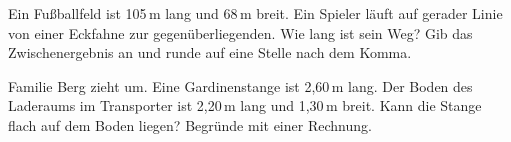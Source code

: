\documentclass[11pt]{article}
\newcommand{\aufg}[3]{\par\noindent\makebox[0pt][r]{#3}\begin{minipage}[t]{\linewidth}#1\end{minipage}\par}
\newcommand{\nr}[1]{\makebox[7mm][l]{\textbf{#1}}}
\begin{document}
\medskip
\aufg{\nr{3.}Ein Fußballfeld ist 105\,m lang und 68\,m breit. Ein Spieler läuft auf gerader Linie von einer Eckfahne zur gegenüberliegenden. Wie lang ist sein Weg? Gib das Zwischenergebnis an und runde auf eine Stelle nach dem Komma.}{}{}
\medskip
\aufg{\nr{4.}Familie Berg zieht um. Eine Gardinenstange ist 2,60\,m lang. Der Boden des Laderaums im Transporter ist 2,20\,m lang und 1,30\,m breit. Kann die Stange flach auf dem Boden liegen? Begründe mit einer Rechnung.}{}{{\scriptsize\color{mbgrau}Ziel\hspace{2mm}}}
\medskip
\par\vspace{3mm}\setlength{\kr}{\dimexpr\pagegoal-\pagetotal-10mm\relax}%
\ifdim\kr>12mm\noindent{\scriptsize\color{mbgrau}Platz zum Rechnen}\par\nointerlineskip\vspace{1mm}\noindent
\begin{tikzpicture}\clip (0,0) rectangle ({\linewidth-0.5mm},\kr);\draw[black!16,line width=0.3pt,step=5mm] (0,0) grid (\linewidth,\kr);\end{tikzpicture}\fi\par
\end{document}
